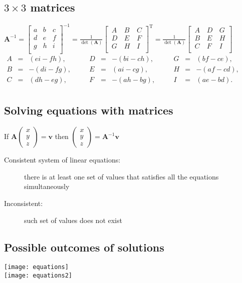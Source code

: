 \subsection{$3\times3$ matrices}
$\mathbf {A} ^{-1}={\begin{bmatrix}a&b&c\\d&e&f\\g&h&i\\\end{bmatrix}}^{-1}={\frac {1}{\det(\mathbf {A} )}}{\begin{bmatrix}\,A&\,B&\,C\\\,D&\,E&\,F\\\,G&\,H&\,I\\\end{bmatrix}}^{\mathrm {T} }={\frac {1}{\det(\mathbf {A} )}}{\begin{bmatrix}\,A&\,D&\,G\\\,B&\,E&\,H\\\,C&\,F&\,I\\\end{bmatrix}}$\\
$\begin{alignedat}{6}A&={}&(ei-fh),&\quad &D&={}&-(bi-ch),&\quad &G&={}&(bf-ce),\\B&={}&-(di-fg),&\quad &E&={}&(ai-cg),&\quad &H&={}&-(af-cd),\\C&={}&(dh-eg),&\quad &F&={}&-(ah-bg),&\quad &I&={}&(ae-bd).\\\end{alignedat}$

\subsection{Solving equations with matrices}
If $\mathbf{A}\begin{pmatrix}
        x \\y\\z
    \end{pmatrix}=\mathbf{v}$ then $\begin{pmatrix}
        x \\y\\z
    \end{pmatrix}=\mathbf{A}^{-1}\mathbf{v}$
\begin{description}
    \item[Consistent system of linear equations:] there is at least one set of values that satisfies all the equations simultaneously
    \item[Inconsistent:] such set of values does not exist
\end{description}

\subsection{Possible outcomes of solutions}
\texttt{[image: equations]}\\
\texttt{[image: equations2]}